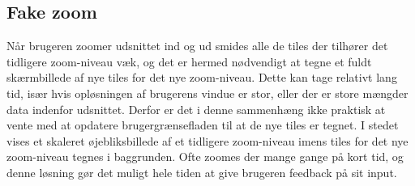 \subsection{Fake zoom}
\label{subsec:fakeZoom}

Når brugeren zoomer udsnittet ind og ud smides alle de tiles der tilhører det tidligere zoom-niveau væk, og det er hermed nødvendigt at tegne et fuldt skærmbillede af nye tiles for det nye zoom-niveau. Dette kan tage relativt lang tid, især hvis opløsningen af brugerens vindue er stor, eller der er store mængder data indenfor udsnittet. Derfor er det i denne sammenhæng ikke praktisk at vente med at opdatere brugergrænsefladen til at de nye tiles er tegnet. I stedet vises et skaleret øjebliksbillede af et tidligere zoom-niveau imens tiles for det nye zoom-niveau tegnes i baggrunden. Ofte zoomes der mange gange på kort tid, og denne løsning gør det muligt hele tiden at give brugeren feedback på sit input.